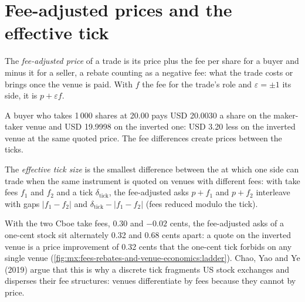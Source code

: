 \section{Fee-adjusted prices and the effective tick}

\begin{definition}\label{def:mx:fees-rebates-and-venue-economics:adjusted}
The \emph{fee-adjusted price} of a trade is its price plus the fee per share for a buyer and minus it for a seller, a rebate
counting as a negative fee: what the trade costs or brings once the venue is paid. With $f$ the fee for the trade's role and $\varepsilon=\pm1$ its side,
it is $p+\varepsilon f$.
\end{definition}

A buyer who takes 1\,000 shares at 20.00 pays USD 20.0030 a share on the maker-taker venue and USD 19.9998 on the inverted one: USD 3.20 less on the
inverted venue at the same quoted price. The fee differences create prices between the ticks.

\begin{definition}\label{def:mx:fees-rebates-and-venue-economics:efftick}
The \emph{effective tick size} is the smallest difference between the  at which one side can trade
when the same instrument is quoted on venues with different fees: with take fees $f_1$ and $f_2$ and a tick $\delta_{\mathrm{tick}}$, the fee-adjusted
asks $p+f_1$ and $p+f_2$ interleave with gaps $|f_1-f_2|$ and $\delta_{\mathrm{tick}}-|f_1-f_2|$ (fees reduced modulo the tick).
\end{definition}

With the two Cboe take fees, 0.30 and $-0.02$ cents, the fee-adjusted asks of a one-cent stock sit alternately 0.32 and 0.68 cents apart: a quote on the
inverted venue is a price improvement of 0.32 cents that the one-cent tick forbids on any single venue (\cref{fig:mx:fees-rebates-and-venue-economics:ladder}).
Chao, Yao and Ye (2019) argue that this is why a discrete tick fragments US stock exchanges and disperses their fee structures: venues differentiate by
fees because they cannot by price.

